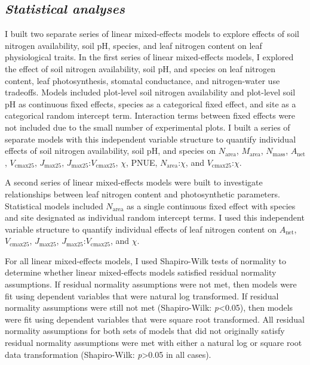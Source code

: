 \subsection{\textit{Statistical analyses}}
\noindent I built two separate series of linear mixed-effects models to explore effects of soil nitrogen availability, soil pH, species, and leaf nitrogen content on leaf physiological traits. In the first series of linear mixed-effects models, I explored the effect of soil nitrogen availability, soil pH, and species on leaf nitrogen content, leaf photosynthesis, stomatal conductance, and nitrogen-water use tradeoffs. Models included plot-level soil nitrogen availability and plot-level soil pH as continuous fixed effects, species as a categorical fixed effect, and site as a categorical random intercept term. Interaction terms between fixed effects were not included due to the small number of experimental plots. I built a series of separate models with this independent variable structure to quantify individual effects of soil nitrogen availability, soil pH, and species on $N_\mathrm{area}$, $M_\mathrm{area}$, $N_\mathrm{mass}$, $A_\mathrm{net}$, $V_\mathrm{cmax25}$, $J_\mathrm{max25}$, $J_\mathrm{max25}$:$V_\mathrm{cmax25}$, $\chi$, PNUE, $N_\mathrm{area}$:$\chi$, and $V_\mathrm{cmax25}$:$\chi$.

A second series of linear mixed-effects models were built to investigate relationships between leaf nitrogen content and photosynthetic parameters. Statistical models included $N_\mathrm{area}$ as a single continuous fixed effect with species and site designated as individual random intercept terms. I used this independent variable structure to quantify individual effects of leaf nitrogen content on $A_\mathrm{net}$, $V_\mathrm{cmax25}$, $J_\mathrm{max25}$, $J_\mathrm{max25}$:$V_\mathrm{cmax25}$, and $\chi$.

For all linear mixed-effects models, I used Shapiro-Wilk tests of normality to determine whether linear mixed-effects models satisfied residual normality assumptions. If residual normality assumptions were not met, then models were fit using dependent variables that were natural log transformed. If residual normality assumptions were still not met (Shapiro-Wilk: \textit{p}<0.05), then models were fit using dependent variables that were square root transformed. All residual normality assumptions for both sets of models that did not originally satisfy residual normality assumptions were met with either a natural log or square root data transformation (Shapiro-Wilk: \textit{p}>0.05 in all cases).

